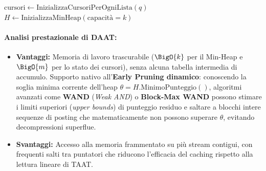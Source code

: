 \begin{algorithm}[H]
\caption{Document-at-a-Time (DAAT)}
\label{alg:daat}

$\text{cursori} \gets \text{InizializzaCursoriPerOgniLista}(q)$\;
$H \gets \text{InizializzaMinHeap}(\text{capacit\`a}=k)$\;

\;
\end{algorithm}

\paragraph{Analisi prestazionale di DAAT:}
\begin{itemize}
    \item \textbf{Vantaggi:} Memoria di lavoro trascurabile ($\BigO{k}$ per il Min-Heap e $\BigO{m}$ per lo stato dei cursori), senza alcuna tabella intermedia di accumulo. Supporto nativo all'\textbf{Early Pruning dinamico}: conoscendo la soglia minima corrente dell'heap $\theta = H.\text{MinimoPunteggio}()$, algoritmi avanzati come \textbf{WAND} (\textit{Weak AND}) o \textbf{Block-Max WAND} possono stimare i limiti superiori (\textit{upper bounds}) di punteggio residuo e saltare a blocchi intere sequenze di posting che matematicamente non possono superare $\theta$, evitando decompressioni superflue.
    \item \textbf{Svantaggi:} Accesso alla memoria frammentato su pi\`u stream contigui, con frequenti salti tra puntatori che riducono l'efficacia del caching rispetto alla lettura lineare di TAAT.
\end{itemize}

